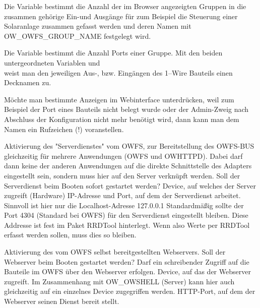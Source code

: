 \begin{description}
Die Variable  bestimmt die Anzahl der im Browser angezeigten
Gruppen in die zusammen gehörige Ein-und Ausgänge für zum Beispiel die
Steuerung einer Solaranlage zusammen gefasst werden und deren Namen mit
OW\_OWFS\_GROUP\_NAME festgelegt wird.

Die Variable  bestimmt die Anzahl Ports
einer Gruppe. Mit den beiden untergeordneten Variablen  und \\
 weist man den jeweiligen Aus-,
bzw. Eingängen des 1--Wire Bauteils einen Decknamen zu.

Möchte man bestimmte Anzeigen im Webinterface unterdrücken, weil zum Beispiel
der Port eines Bauteils nicht belegt wurde oder der Admin-Zweig nach Abschluss der
Konfiguration nicht mehr benötigt wird, dann kann man dem Namen ein Rufzeichen
(!) voranstellen.

Aktivierung des "Serverdienstes" vom OWFS, zur Bereitstellung des OWFS-BUS gleichzeitig
für mehrere Anwendungen (OWFS und OWHTTPD). Dabei darf dann keine der anderen
Anwendungen auf die direkte Schnittstelle des Adapters eingestellt sein, sondern
muss hier auf den Server verknüpft werden.
Soll der Serverdienst beim Booten sofort gestartet werden?
Device, auf welches der Server zugreift (Hardware)
IP-Adresse und Port, auf dem der Serverdienst arbeitet.
Sinnvoll ist hier nur die Localhost-Adresse 127.0.0.1
Standardmäßig sollte der Port 4304 (Standard bei OWFS) für den
Serverdienst eingestellt bleiben. Diese Addresse ist fest im Paket
RRDTool hinterlegt. Wenn also Werte per RRDTool erfasst werden sollen,
muss dies so bleiben.

Aktivierung des vom OWFS selbst bereitgestellten Webservers.
Soll der Webserver beim Booten gestartet werden?
Darf ein schreibender Zugriff auf die Bauteile im OWFS über den Webserver erfolgen.
Device, auf das der Webserver zugreift. Im Zusammenhang mit OW\_OWSHELL (Server) kann
hier auch gleichzeitig auf ein einzelnes Device zugegriffen werden.
HTTP-Port, auf dem der Webserver seinen Dienst bereit stellt.


\end{description}
